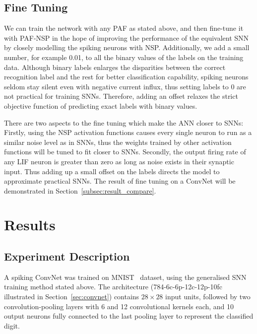 	\subsection{Fine Tuning}
	We can train the network with any PAF as stated above, and then fine-tune it with PAF-NSP in the hope of improving the performance of the equivalent SNN by closely modelling the spiking neurons with NSP.
	Additionally, we add a small number, for example 0.01, to all the binary values of the labels on the training data.
	Although binary labels enlarges the disparities between the correct recognition label and the rest for better classification capability, 
	spiking neurons seldom stay silent even with negative current influx, thus setting labels to 0 are not practical for training SNNs.
	Therefore, adding an offset relaxes the strict objective function of predicting exact labels with binary values.
	
	
	There are two aspects to the fine tuning which make the ANN closer to SNNs:
	Firstly, using the NSP activation functions causes every single neuron to run as a similar noise level as in SNNs, thus the weights trained by other activation functions will be tuned to fit closer to SNNs.
	Secondly, the output firing rate of any LIF neuron is greater than zero as long as noise exists in their synaptic input.
	Thus adding up a small offset on the labels directs the model to approximate practical SNNs. 
	The result of fine tuning on a ConvNet will be demonstrated in Section~\ref{subsec:result_compare}.
	
\section{Results}
\label{sec:iconipResult}
	\subsection{Experiment Description}
	A spiking ConvNet was trained on MNIST~\citep{lecun1998gradient} dataset, 
	using the generalised SNN training method stated above.
	The architecture (784-6c-6p-12c-12p-10fc illustrated in Section~\ref{sec:convnet}) contains $28\times28$ input units, followed by two convolution-pooling layers with 6 and 12 convolutional kernels each, and 10 output neurons fully connected to the last pooling layer to represent the classified digit.
	
